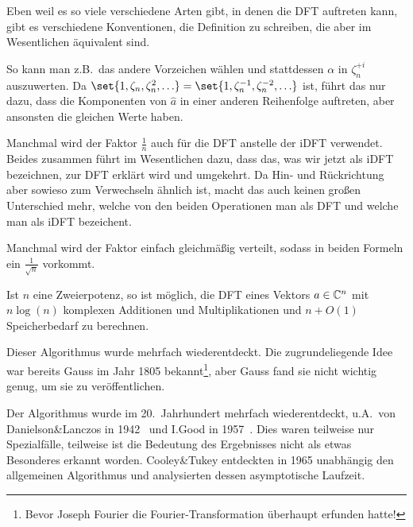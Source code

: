 \begin{remark}
    Eben weil es so viele verschiedene Arten gibt, in denen die DFT auftreten kann, gibt es verschiedene Konventionen, die Definition zu schreiben, die aber im Wesentlichen äquivalent sind.

    So kann man z.B.\ das andere Vorzeichen wählen und stattdessen $\alpha$ in $\zeta_n^{+i}$ auszuwerten. Da $\set{1, \zeta_n, \zeta_n^2, \ldots} = \set{1, \zeta_n^{-1}, \zeta_n^{-2}, \ldots}$ ist, führt das nur dazu, dass die Komponenten von $\hat{a}$ in einer anderen Reihenfolge auftreten, aber ansonsten die gleichen Werte haben.

    Manchmal wird der Faktor $\frac{1}{n}$ auch für die DFT anstelle der iDFT verwendet. Beides zusammen führt im Wesentlichen dazu, dass das, was wir jetzt als iDFT bezeichnen, zur DFT erklärt wird und umgekehrt. Da Hin- und Rückrichtung aber sowieso zum Verwechseln ähnlich ist, macht das auch keinen großen Unterschied mehr, welche von den beiden Operationen man als DFT und welche man als iDFT bezeichent.

    Manchmal wird der Faktor einfach gleichmäßig verteilt, sodass in beiden Formeln ein $\frac{1}{\sqrt{n}}$ vorkommt.
\end{remark}

\begin{theorem}
    Ist $n$ eine Zweierpotenz, so ist möglich, die DFT eines Vektors $a\in\mathbb{C}^n$ mit $n\log(n)$ komplexen Additionen und Multiplikationen und $n+O(1)$ Speicherbedarf zu berechnen.
\end{theorem}

\begin{remark}
    Dieser Algorithmus wurde mehrfach wiederentdeckt. Die zugrundeliegende Idee war bereits Gauss im Jahr 1805 bekannt\footnote{Bevor Joseph Fourier die Fourier-Transformation überhaupt erfunden hatte!}, aber Gauss fand sie nicht wichtig genug, um sie zu veröffentlichen.

    Der Algorithmus wurde im 20.\ Jahrhundert mehrfach wiederentdeckt, u.A.\ von Danielson\&Lanczos in 1942~\cite{danielson_lanczos} und I.Good in 1957~\cite{good}. Dies waren teilweise nur Spezialfälle, teilweise ist die Bedeutung des Ergebnisses nicht als etwas Besonderes erkannt worden. Cooley\&Tukey entdeckten in 1965 unabhängig den allgemeinen Algorithmus und analysierten dessen asymptotische Laufzeit.
\end{remark}

